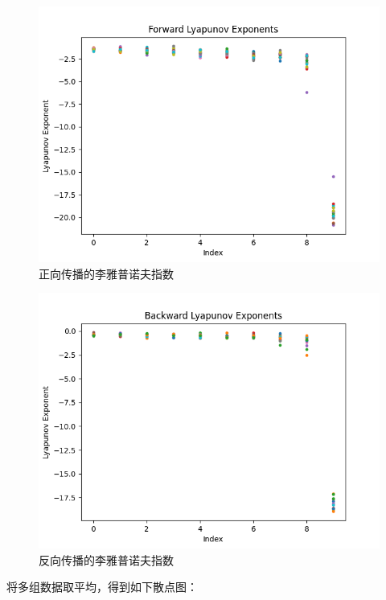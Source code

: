 \begin{figure}[htbp]
  \centering
  \includegraphics[width=1\textwidth]{figures/forward_lyapunov.png}
  \caption{正向传播的李雅普诺夫指数}
  \label{fig:nn_lyapunov_exponents}
\end{figure}

\begin{figure}[htbp]
  \centering
  \includegraphics[width=1\textwidth]{figures/backward_lyapunov.png}
  \caption{反向传播的李雅普诺夫指数}
  \label{fig:nn_lyapunov_exponents}
\end{figure}

将多组数据取平均，得到如下散点图：

